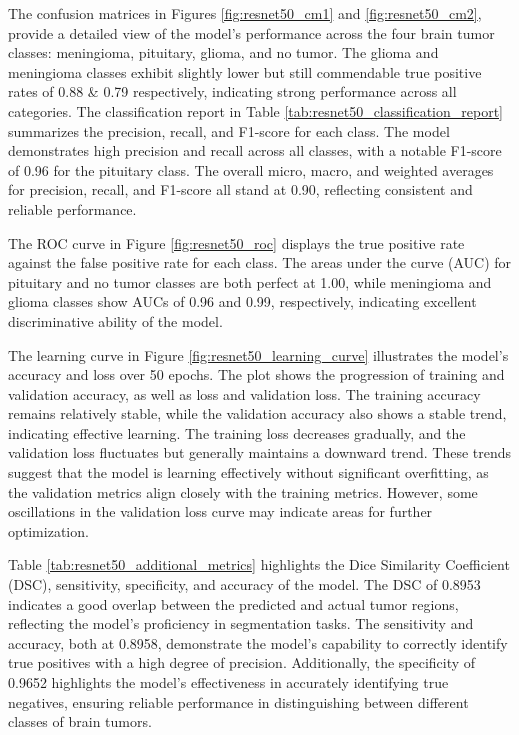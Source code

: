 The confusion matrices in Figures \ref{fig:resnet50_cm1} and \ref{fig:resnet50_cm2}, provide a detailed view of the model's performance across the four brain tumor classes: meningioma, pituitary, glioma, and no tumor. The glioma and meningioma classes exhibit slightly lower but still commendable true positive rates of 0.88 & 0.79 respectively, indicating strong performance across all categories. The classification report in Table \ref{tab:resnet50_classification_report} summarizes the precision, recall, and F1-score for each class. The model demonstrates high precision and recall across all classes, with a notable F1-score of 0.96 for the pituitary class. The overall micro, macro, and weighted averages for precision, recall, and F1-score all stand at 0.90, reflecting consistent and reliable performance.

The ROC curve in Figure \ref{fig:resnet50_roc} displays the true positive rate against the false positive rate for each class. The areas under the curve (AUC) for pituitary and no tumor classes are both perfect at 1.00, while meningioma and glioma classes show AUCs of 0.96 and 0.99, respectively, indicating excellent discriminative ability of the model.

The learning curve in Figure \ref{fig:resnet50_learning_curve} illustrates the model's accuracy and loss over 50 epochs. The plot shows the progression of training and validation accuracy, as well as loss and validation loss. The training accuracy remains relatively stable, while the validation accuracy also shows a stable trend, indicating effective learning. The training loss decreases gradually, and the validation loss fluctuates but generally maintains a downward trend. These trends suggest that the model is learning effectively without significant overfitting, as the validation metrics align closely with the training metrics. However, some oscillations in the validation loss curve may indicate areas for further optimization.

Table \ref{tab:resnet50_additional_metrics} highlights the Dice Similarity Coefficient (DSC), sensitivity, specificity, and accuracy of the model. The DSC of 0.8953 indicates a good overlap between the predicted and actual tumor regions, reflecting the model's proficiency in segmentation tasks. The sensitivity and accuracy, both at 0.8958, demonstrate the model's capability to correctly identify true positives with a high degree of precision. Additionally, the specificity of 0.9652 highlights the model's effectiveness in accurately identifying true negatives, ensuring reliable performance in distinguishing between different classes of brain tumors.

